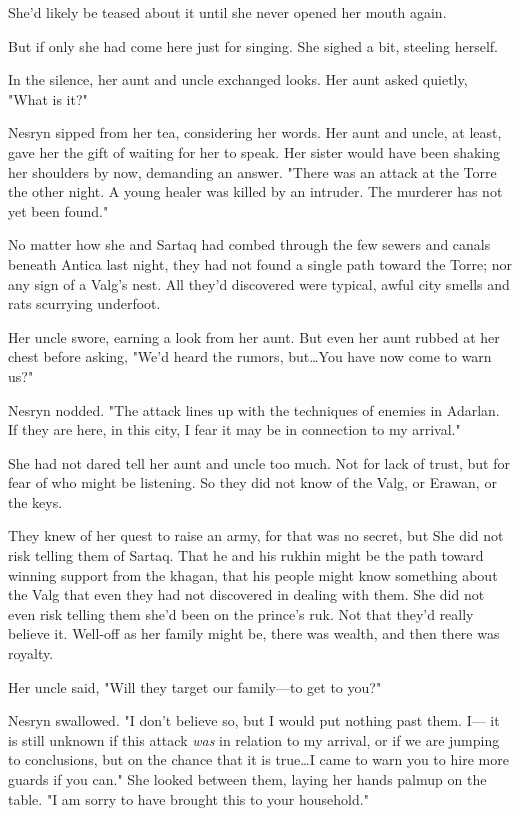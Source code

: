 She'd likely be teased about it until she never opened her mouth again.

But if only she had come here just for singing.
She sighed a bit, steeling herself.

In the silence, her aunt and uncle exchanged looks.
Her aunt asked quietly, "What is it?"

Nesryn sipped from her tea, considering her words.
Her aunt and uncle, at least, gave her the gift of waiting for her to speak.
Her sister would have been shaking her shoulders by now, demanding an answer.
"There was an attack at the Torre the other night.
A young healer was killed by an intruder.
The murderer has not yet been found."

No matter how she and Sartaq had combed through the few sewers and canals beneath Antica last night, they had not found a single path toward the Torre; nor any sign of a Valg's nest.
All they'd discovered were typical, awful city smells and rats scurrying underfoot.

Her uncle swore, earning a look from her aunt.
But even her aunt rubbed at her chest before asking, "We'd heard the rumors, but\ldots You have now come to warn us?"

Nesryn nodded.
"The attack lines up with the techniques of enemies in Adarlan.
If they are here, in this city, I fear it may be in connection to my arrival."

She had not dared tell her aunt and uncle too much.
Not for lack of trust, but for fear of who might be listening.
So they did not know of the Valg, or Erawan, or the keys.

They knew of her quest to raise an army, for that was no secret, but  She did not risk telling them of Sartaq.
That he and his rukhin might be the path toward winning support from the khagan, that his people might know something about the Valg that even they had not discovered in dealing with them.
She did not even risk telling them she'd been on the prince's ruk.
Not that they'd really believe it.
Well-off as her family might be, there was wealth, and then there was royalty.

Her uncle said, "Will they target our family---to get to you?"

Nesryn swallowed.
"I don't believe so, but I would put nothing past them.
I--- it is still unknown if this attack \emph{was} in relation to my arrival, or if we are jumping to conclusions, but on the chance that it is true\ldots I came to warn you to hire more guards if you can."
She looked between them, laying her hands palmup on the table.
"I am sorry to have brought this to your household."

